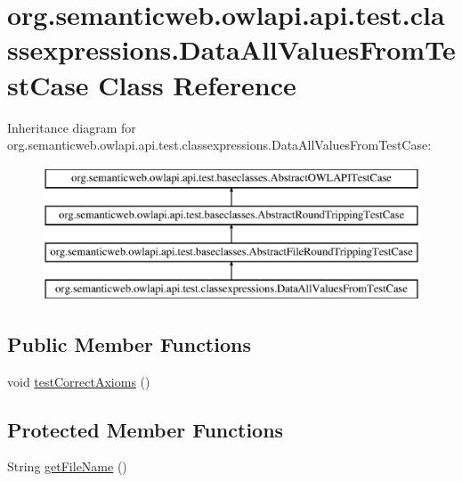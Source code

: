\hypertarget{classorg_1_1semanticweb_1_1owlapi_1_1api_1_1test_1_1classexpressions_1_1_data_all_values_from_test_case}{\section{org.\-semanticweb.\-owlapi.\-api.\-test.\-classexpressions.\-Data\-All\-Values\-From\-Test\-Case Class Reference}
\label{classorg_1_1semanticweb_1_1owlapi_1_1api_1_1test_1_1classexpressions_1_1_data_all_values_from_test_case}
}
Inheritance diagram for org.\-semanticweb.\-owlapi.\-api.\-test.\-classexpressions.\-Data\-All\-Values\-From\-Test\-Case\-:\begin{figure}[H]
\begin{center}
\leavevmode
\includegraphics[height=4.000000cm]{classorg_1_1semanticweb_1_1owlapi_1_1api_1_1test_1_1classexpressions_1_1_data_all_values_from_test_case}
\end{center}
\end{figure}
\subsection*{Public Member Functions}
\begin{DoxyCompactItemize}
\item 
void \hyperlink{classorg_1_1semanticweb_1_1owlapi_1_1api_1_1test_1_1classexpressions_1_1_data_all_values_from_test_case_ab01ba7badccc33ae55a887af64ce5430}{test\-Correct\-Axioms} ()
\end{DoxyCompactItemize}
\subsection*{Protected Member Functions}
\begin{DoxyCompactItemize}
\item 
String \hyperlink{classorg_1_1semanticweb_1_1owlapi_1_1api_1_1test_1_1classexpressions_1_1_data_all_values_from_test_case_a36c5c072f0bf666356823c0e18d45e17}{get\-File\-Name} ()
\end{DoxyCompactItemize}


